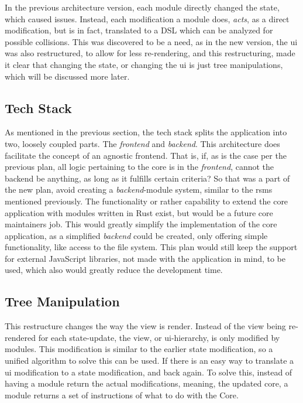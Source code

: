 In the previous architecture version, each module directly changed the state,
which caused issues. Instead, each modification a module does, \textit{acts}, as
a direct modification, but is in fact, translated to a DSL which can be analyzed
for possible collisions. This was discovered to be a need, as in the new
version, the \gls{ui} was also restructured, to allow for less re-rendering, and
this restructuring, made it clear that changing the state, or changing the
\gls{ui} is just tree manipulations, which will be discussed more later.


\subsection{Tech Stack}

As mentioned in the previous section, the tech stack splits the application into
two, loosely coupled parts. The \textit{frontend} and \textit{backend}. This
architecture does facilitate the concept of an agnostic frontend. That is, if,
as is the case per the previous plan, all logic pertaining to the core is in the
\textit{frontend}, cannot the backend be anything, as long as it fulfills
certain criteria?
So that was a part of the new plan, avoid creating a \textit{backend}-module
system, similar to the \gls{rsms} mentioned previously. The functionality or
rather capability to extend the core application with modules written in Rust
exist, but would be a future core maintainers job. This would greatly simplify
the implementation of the core application, as a simplified \textit{backend}
could be created, only offering simple functionality, like access to the file
system. This plan would still keep the support for external JavaScript
libraries, not made with the application in mind, to be used, which also would
greatly reduce the development time.

\subsection{Tree Manipulation}


This restructure changes the way the view is render. Instead of the view being
re-rendered for each state-update, the view, or \gls{ui}-hierarchy, is only
modified by modules. This modification is similar to the earlier state
modification, so a unified algorithm to solve this can be used. If there is an
easy way to translate a \gls{ui} modification to a state modification, and back
again. To solve this, instead of having a module return the actual
modifications, meaning, the updated core, a module returns a set of instructions
of what to do with the Core.

